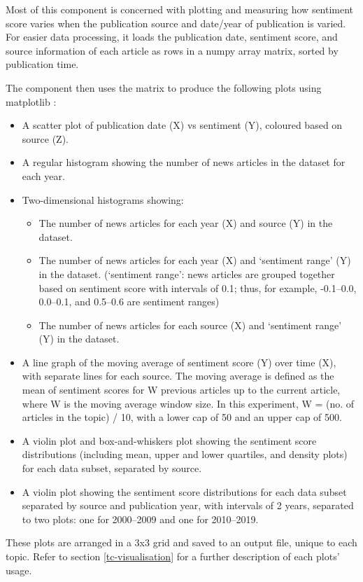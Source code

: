 \documentclass{report}
\begin{document}
Most of this component is concerned with plotting and measuring how sentiment score varies when the publication source and date/year of publication is varied.
For easier data processing, it loads the publication date, sentiment score, and source information of each article as rows in a numpy array matrix, sorted by publication time.

The component then uses the matrix to produce the following plots using matplotlib \cite{Matplotlib}:
\begin{itemize}
	\item A scatter plot of publication date (X) vs sentiment (Y), coloured based on source (Z).
	\item A regular histogram showing the number of news articles in the dataset for each year.
	\item Two-dimensional histograms showing:
		\begin{itemize}
			\item The number of news articles for each year (X) and source (Y) in the dataset.
			\item The number of news articles for each year (X) and `sentiment range' (Y) in the dataset.
			(`sentiment range': news articles are grouped together based on sentiment score with intervals of 0.1; thus, for example, -0.1--0.0, 0.0--0.1, and 0.5--0.6 are sentiment ranges)
			\item The number of news articles for each source (X) and `sentiment range' (Y) in the dataset.
		\end{itemize}
	\item A line graph of the moving average of sentiment score (Y) over time (X), with separate lines for each source.
		The moving average is defined as the mean of sentiment scores for W previous articles up to the current article, where W is the moving average window size.
		In this experiment, W = (no. of articles in the topic) / 10, with a lower cap of 50 and an upper cap of 500.
	\item A violin plot \cite{hintze1998violin} and box-and-whiskers plot \cite{tukey1977exploratory} showing the sentiment score distributions (including mean, upper and lower quartiles, and density plots) for each data subset, separated by source.
	\item A violin plot showing the sentiment score distributions for each data subset separated by source and publication year, with intervals of 2 years, separated to two plots: one for 2000--2009 and one for 2010--2019.
\end{itemize}
These plots are arranged in a 3x3 grid and saved to an output file, unique to each topic. 
Refer to section \ref{tc-visualisation} for a further description of each plots' usage.
\end{document}
